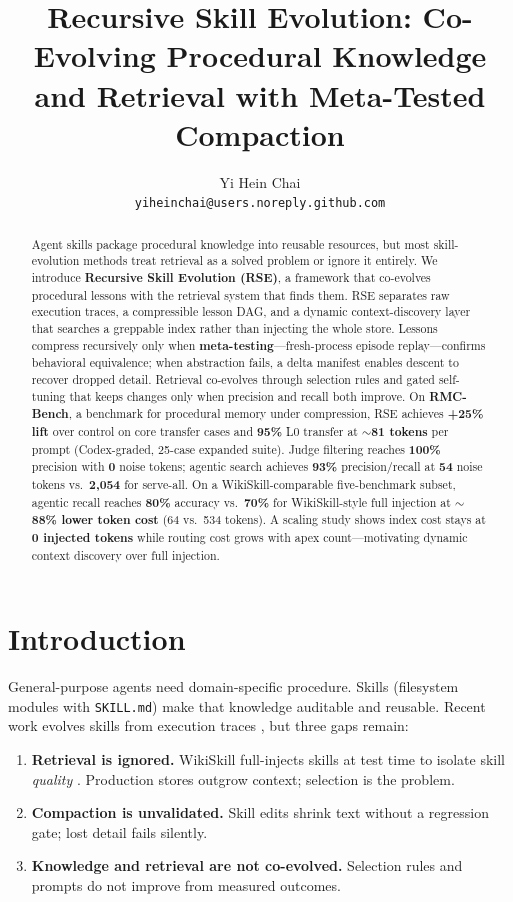 \documentclass[11pt]{article}
\title{Recursive Skill Evolution: Co-Evolving Procedural Knowledge and Retrieval with Meta-Tested Compaction}
\author{
  Yi Hein Chai \\
  \texttt{yiheinchai@users.noreply.github.com}
}
\begin{document}
\maketitle

\begin{abstract}
Agent skills package procedural knowledge into reusable resources, but most skill-evolution methods treat retrieval as a solved problem or ignore it entirely.
We introduce \textbf{Recursive Skill Evolution (RSE)}, a framework that co-evolves procedural lessons with the retrieval system that finds them.
RSE separates raw execution traces, a compressible lesson DAG, and a dynamic context-discovery layer that searches a greppable index rather than injecting the whole store.
Lessons compress recursively only when \textbf{meta-testing}---fresh-process episode replay---confirms behavioral equivalence; when abstraction fails, a delta manifest enables descent to recover dropped detail.
Retrieval co-evolves through selection rules and gated self-tuning that keeps changes only when precision and recall both improve.
On \textbf{RMC-Bench}, a benchmark for procedural memory under compression, RSE achieves \textbf{+25\% lift} over control on core transfer cases and \textbf{95\%} L0 transfer at \textbf{$\sim$81 tokens} per prompt (Codex-graded, 25-case expanded suite).
Judge filtering reaches \textbf{100\%} precision with \textbf{0} noise tokens; agentic search achieves \textbf{93\%} precision/recall at \textbf{54} noise tokens vs.\ \textbf{2,054} for serve-all.
On a WikiSkill-comparable five-benchmark subset, agentic recall reaches \textbf{80\%} accuracy vs.\ \textbf{70\%} for WikiSkill-style full injection at \textbf{$\sim$88\% lower token cost} (64 vs.\ 534 tokens).
A scaling study shows index cost stays at \textbf{0 injected tokens} while routing cost grows with apex count---motivating dynamic context discovery over full injection.
\end{abstract}

\section{Introduction}
\label{sec:intro}

General-purpose agents need domain-specific procedure.
Skills (filesystem modules with \texttt{SKILL.md}) make that knowledge auditable and reusable.
Recent work evolves skills from execution traces \citep{wikiskill2026,wang2023voyager,shinn2023reflexion}, but three gaps remain:

\begin{enumerate}
  \item \textbf{Retrieval is ignored.} WikiSkill full-injects skills at test time to isolate skill \emph{quality} \citep{wikiskill2026}.
    Production stores outgrow context; selection is the problem.
  \item \textbf{Compaction is unvalidated.} Skill edits shrink text without a regression gate; lost detail fails silently.
  \item \textbf{Knowledge and retrieval are not co-evolved.} Selection rules and prompts do not improve from measured outcomes.
\end{enumerate}
\end{document}
